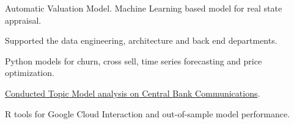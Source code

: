 \documentclass[]{deedy-resume-openfont}
\begin{document}
\begin{minipage}[t]{0.66\textwidth}
\begin{tightemize}
\item Automatic Valuation Model. Machine Learning based model for real state appraisal.
\item Supported the data engineering, architecture and back end departments.
\end{tightemize}
\sectionsep

\begin{tightemize}
\item Python models for churn, cross sell, time series forecasting and price optimization.
\end{tightemize}
\sectionsep

\begin{tightemize}
\item \href{
https://www.bbvaresearch.com/en/publicaciones/how-do-the-emerging-markets-central-bank-talk-a-big-data-approach-to-the-cb-of-turkey/
}
  {Conducted Topic Model analysis on Central Bank Communications}. 
\item R tools for Google Cloud Interaction and out-of-sample model performance. 
\end{tightemize}
\sectionsep



\end{minipage}
\end{document}
